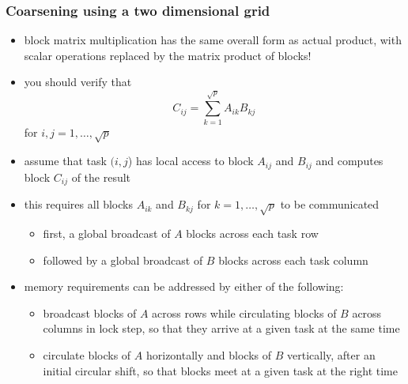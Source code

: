 \begin{frame}[fragile]
%
  \frametitle{Coarsening using a two dimensional grid}
%
  \begin{itemize}
%
  \item block matrix multiplication has the same overall form as actual product, with scalar
    operations replaced by the matrix product of blocks!
%
  \item you should verify that
    \begin{equation}
      C_{ij} = \sum_{k=1}^{\sqrt{p}} A_{ik} B_{kj}
    \end{equation}
    for $i,j = 1, \ldots, \sqrt{p}$
%
  \item assume that task $(i,j$) has local access to block $A_{ij}$ and $B_{ij}$ and computes
    block $C_{ij}$ of the result
%
  \item this requires all blocks $A_{ik}$ and $B_{kj}$ for $k=1,\ldots,\sqrt{p}$ to be
    communicated
    \begin{itemize}
    \item first, a global broadcast of $A$ blocks across each task row 
    \item followed by a global broadcast of $B$ blocks across each task column 
    \end{itemize}
%
  \item memory requirements can be addressed by either of the following:
    \begin{itemize}
    \item broadcast blocks of $A$ across rows while circulating blocks of $B$ across columns in
      lock step, so that they arrive at a given task at the same time
    \item circulate blocks of $A$ horizontally and blocks of $B$ vertically, after an initial
      circular shift, so that blocks meet at a given task at the right time
    \end{itemize}
%
  \end{itemize}
%
\end{frame}

